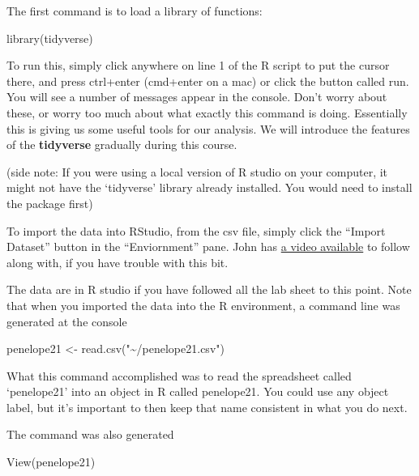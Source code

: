 \documentclass[
]{book}
\newenvironment{Shaded}{\begin{snugshade}}{\end{snugshade}}
\newcommand{\FunctionTok}[1]{\textcolor[rgb]{0.00,0.00,0.00}{#1}}
\newcommand{\NormalTok}[1]{#1}
\newcommand{\OtherTok}[1]{\textcolor[rgb]{0.56,0.35,0.01}{#1}}
\newcommand{\StringTok}[1]{\textcolor[rgb]{0.31,0.60,0.02}{#1}}
\begin{document}
The first command is to load a library of functions:

\begin{Shaded}
\begin{Highlighting}[]
\FunctionTok{library}\NormalTok{(tidyverse)}
\end{Highlighting}
\end{Shaded}

To run this, simply click anywhere on line 1 of the R script to put the cursor there, and press ctrl+enter (cmd+enter on a mac) or click the button called run. You will see a number of messages appear in the console. Don't worry about these, or worry too much about what exactly this command is doing. Essentially this is giving us some useful tools for our analysis. We will introduce the features of the \textbf{tidyverse} gradually during this course.

(side note: If you were using a local version of R studio on your computer, it might not have the `tidyverse' library already installed. You would need to install the package first)

To import the data into RStudio, from the csv file, simply click the ``Import Dataset'' button in the ``Enviornment'' pane. John has \href{https://dtu-panopto.lancs.ac.uk/Panopto/Pages/Viewer.aspx?id=646a4bd4-9b2e-46a1-b2ee-adc100ce507b}{a video available} to follow along with, if you have trouble with this bit.

The data are in R studio if you have followed all the lab sheet to this point. Note that when you imported the data into the R environment, a command line was generated at the console

\begin{Shaded}
\begin{Highlighting}[]
\NormalTok{ penelope21 }\OtherTok{\textless{}{-}} \FunctionTok{read.csv}\NormalTok{(}\StringTok{"\textasciitilde{}/penelope21.csv"}\NormalTok{)}
\end{Highlighting}
\end{Shaded}

What this command accomplished was to read the spreadsheet called `penelope21' into an object in R called penelope21. You could use any object label, but it's important to then keep that name consistent in what you do next.

The command was also generated

\begin{Shaded}
\begin{Highlighting}[]
 \FunctionTok{View}\NormalTok{(penelope21)}
\end{Highlighting}
\end{Shaded}
\end{document}
